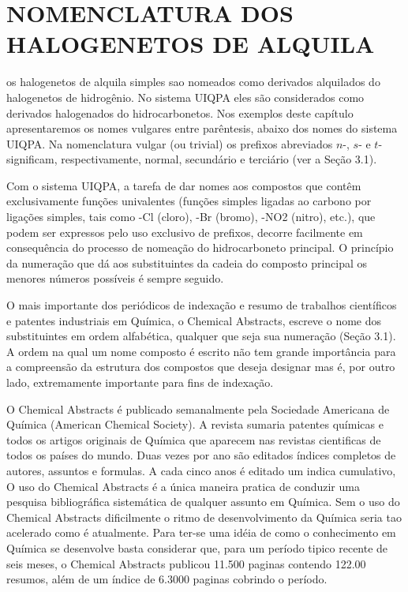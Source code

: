 \section{NOMENCLATURA DOS HALOGENETOS DE ALQUILA}

os halogenetos de alquila simples sao nomeados como derivados alquilados do halogenetos de hidrogênio. No sistema UIQPA eles são considerados como derivados halogenados do hidrocarbonetos. Nos exemplos deste capítulo apresentaremos os nomes vulgares entre parêntesis, abaixo dos nomes do sistema UIQPA. Na nomenclatura vulgar (ou trivial) os prefixos abreviados $n$-, $s$- e $t$- significam, respectivamente, normal, secundário e terciário (ver a Seção 3.1). 

Com o sistema UIQPA, a tarefa de dar nomes aos compostos que contêm exclusivamente funções univalentes (funções simples ligadas ao carbono por ligações simples, tais como -Cl (cloro), -Br (bromo), -NO2 (nitro), etc.), que podem ser expressos pelo uso exclusivo de prefixos, decorre facilmente em consequência do processo de nomeação do hidrocarboneto principal. O princípio da numeração que dá aos substituintes da cadeia do composto principal os menores números possíveis é sempre seguido.

O mais importante dos periódicos de indexação e resumo de trabalhos científicos e patentes industriais em Química, o Chemical Abstracts, escreve o nome dos substituintes em ordem alfabética, qualquer que seja sua numeração (Seção 3.1). A ordem na qual um nome composto é escrito não tem grande importância para a compreensão da estrutura dos compostos que deseja designar mas é, por outro lado, extremamente importante para fins de indexação.

O Chemical Abstracts é publicado semanalmente pela Sociedade Americana de Química (American Chemical Society). A revista sumaria patentes químicas e todos os artigos originais de Química que aparecem nas revistas cientificas de todos os países do mundo. Duas vezes por ano são editados índices completos de autores, assuntos e formulas. A cada cinco anos é editado um indica cumulativo, O uso do Chemical Abstracts é a única maneira pratica de conduzir uma pesquisa bibliográfica sistemática de qualquer assunto em Química. Sem o uso do Chemical Abstracts dificilmente o ritmo de desenvolvimento da Química seria tao acelerado como é atualmente. Para ter-se uma idéia de como o conhecimento em Química se desenvolve basta considerar que, para um período tipico recente de seis meses, o Chemical Abstracts publicou 11.500 paginas contendo 122.00 resumos, além de um índice de 6.3000 paginas cobrindo o período.

